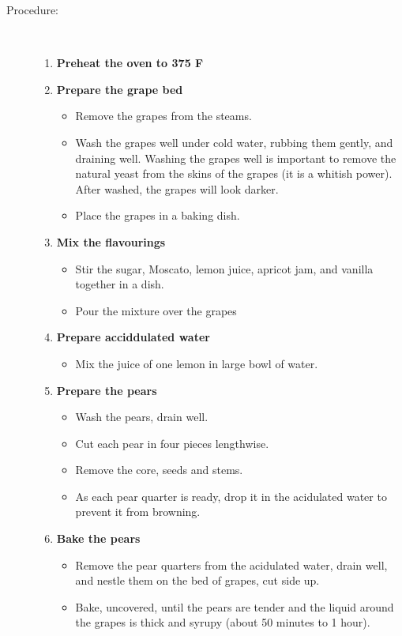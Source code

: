\documentclass[11pt,letterpaper]{article}
\begin{document}
\begin{description}
\item[Procedure:]\ \\
	\begin{enumerate}
	\item {\bf Preheat the oven to 375 F}
	\item {\bf Prepare the grape bed}
	\begin{itemize}
	\item Remove the grapes from the steams.
        \item Wash the grapes well under cold water, rubbing them gently, and draining well. Washing the grapes well is important to remove the natural yeast from the skins of the grapes (it is a whitish power). After washed, the grapes will look darker.
	\item Place the grapes in a baking dish.
	\end{itemize}
	\item {\bf Mix the flavourings}
	\begin{itemize}
	\item Stir the sugar, Moscato, lemon juice, apricot jam, and vanilla together in a dish.
	\item Pour the mixture over the grapes
	\end{itemize}
	\item {\bf Prepare acciddulated water}
	\begin{itemize}
	\item Mix the juice of one lemon in large bowl of water.
	\end{itemize}
	\item {\bf Prepare the pears}
	\begin{itemize}
	\item Wash the pears, drain well.
	\item Cut each pear in four pieces lengthwise.
	\item Remove the core, seeds and stems.
	\item As each pear quarter is ready, drop it in the acidulated water to prevent it from browning.
	\end{itemize}
	\item {\bf Bake the pears}
	\begin{itemize}
	\item Remove the pear quarters from the acidulated water, drain well, and nestle them on the bed of grapes, cut side up.
	\item Bake, uncovered, until the pears are tender and the liquid around the grapes is thick and syrupy (about 50 minutes to 1 hour).
	\end{itemize}

\end{enumerate}
\end{description}
\end{document}
